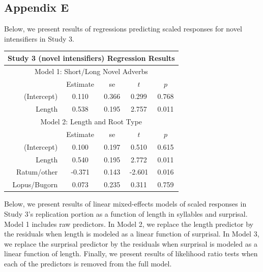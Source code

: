\subsection{Appendix E}

Below, we present results of regressions predicting scaled responses for novel intensifiers in Study 3.

\vspace{4mm}

\noindent
\footnotesize{
\begin{tabular}{r|cccc}
\hline
\hline
\multicolumn{5}{c}{\textbf{Study 3 (novel intensifiers) Regression Results}} \\
\hline
\hline
\multicolumn{5}{c}{Model 1: Short/Long Novel Adverbs} \\
& Estimate & se & $t$ & $p$ \\
\hline
(Intercept) &  0.110 & 0.366 & 0.299 & 0.768 \\
Length &  0.538 & 0.195 & 2.757 & 0.011 \\
\hline
\hline
\multicolumn{5}{c}{Model 2: Length and Root Type} \\
& Estimate & se & $t$ & $p$ \\
\hline
(Intercept) & 0.100  & 0.197 & 0.510 & 0.615 \\
Length & 0.540  & 0.195 &   2.772 & 0.011 \\
Ratum/other & -0.371  & 0.143 &  -2.601 & 0.016 \\
Lopus/Bugorn &  0.073  & 0.235 &   0.311 & 0.759 \\
\hline
\hline
\end{tabular}
}

\vspace{4mm}


Below, we present results of linear mixed-effects models of scaled responses in Study 3's replication portion as a function of length in syllables and surprisal.
Model 1 includes raw predictors.
In Model 2, we replace the length predictor by the residuals when length is modeled as a linear function of surprisal.
In Model 3, we replace the surprisal predictor by the residuals when surprisal is modeled as a linear function of length.
Finally, we present results of likelihood ratio tests when each of the predictors is removed from the full model.

\vspace{4mm}


